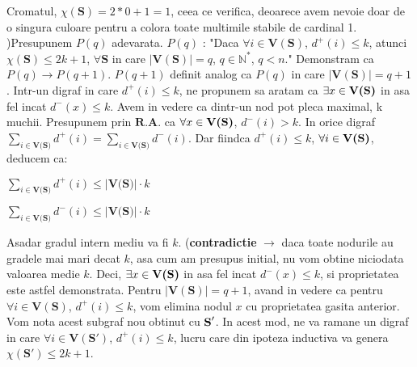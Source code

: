 \documentclass{article}
\begin{document}
    Cromatul, $\chi(\textbf{S})=2*0+1=1$, ceea ce verifica, deoarece avem nevoie doar de o singura culoare pentru a colora toate multimile stabile de cardinal 1.
    \newline
    )Presupunem $P(q)$ adevarata.
    \newline
    $P(q)$ : "Daca $\forall i \in \textbf{V}(\textbf{S})$, $d^+ (i) \leq k$, atunci $\chi(\textbf{S}) \leq 2k+1$, $\forall \textbf{S}$ in care $|\textbf{V}(\textbf{S})|=q$, $q \in \mathbb{N}^*$, $q<n$."
    \newline
    Demonstram ca $P(q)\rightarrow P(q+1)$.
    \newline
    $P(q+1)$ definit analog ca $P(q)$ in care $|\textbf{V}(\textbf{S})|=q+1$.
     \newline
     \newline
    Intr-un digraf in care $d^+ (i) \leq k $, ne propunem sa aratam ca $\exists x \in \textbf{V(\textbf{S})}$ in asa fel incat $d^- (x) \leq k $. Avem in vedere ca dintr-un nod pot pleca maximal, k muchii.
    \newline
    \newline
    Presupunem prin $\textbf{R.A.}$ ca $\forall x \in \textbf{V(\textbf{S})}$, $d^- (i) > k $.  
    In orice digraf $\sum_{i \in \textbf{V(S)}} d^+ (i)=\sum_{i \in \textbf{V(S)}} d^- (i)$. 
    Dar fiindca $d^+ (i) \leq k $, $\forall i \in \textbf{V(\textbf{S})}$, deducem ca: 
     \begin{center}
    $\sum_{i \in \textbf{V(S)}} d^+ (i) \leq |\textbf{V(S)}| \cdot k$
    \end{center}
	\begin{center}
     $\sum_{i \in \textbf{V(S)}} d^- (i) \leq |\textbf{V(S)}| \cdot k$
    \end{center}
     Asadar gradul intern mediu va fi $k$. (\textbf{contradictie} $\rightarrow$ daca toate nodurile au gradele mai mari decat $k$, asa cum am presupus initial, nu vom obtine niciodata valoarea medie $k$. Deci, $\exists x \in \textbf{V(\textbf{S})}$ in asa fel incat $d^- (x) \leq k $, si proprietatea este astfel demonstrata.
    \newline
    \newline
    Pentru $|\textbf{V}(\textbf{S})|=q+1$, avand in vedere ca pentru $\forall i \in \textbf{V}(\textbf{S})$, $d^+ (i) \leq k$, vom elimina nodul $x$ cu proprietatea gasita anterior.
    \newline
    \newline
    Vom nota acest subgraf nou obtinut cu $\textbf S'$. In acest mod, ne va ramane un digraf in care $\forall i \in \textbf{V}(\textbf{S}')$, $d^+ (i) \leq k $, lucru care din ipoteza inductiva va genera $\chi(\textbf{S}') \leq 2k+1$.
\end{document}
